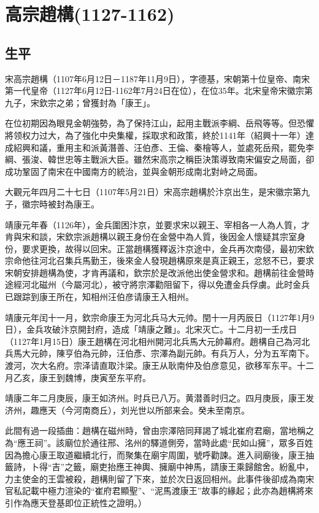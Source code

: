 
\section{高宗趙構\tiny(1127-1162)}

\subsection{生平}

宋高宗趙構（1107年6月12日－1187年11月9日），字德基，宋朝第十位皇帝、南宋第一代皇帝（1127年6月12日-1162年7月24日在位），在位35年。北宋皇帝宋徽宗第九子，宋欽宗之弟；曾獲封為「康王」。

在位初期因為眼見金朝強勢，為了保持江山，起用主戰派李綱、岳飛等等。但恐懼將领权力过大，為了強化中央集權，採取求和政策，終於1141年（紹興十一年）達成紹興和議，重用主和派黃潛善、汪伯彥、王倫、秦檜等人，並處死岳飛，罷免李綱、張浚、韓世忠等主戰派大臣。雖然宋高宗之稱臣決策導致南宋偏安之局面，卻成功鞏固了南宋在中國南方的統治，並與金朝形成南北對峙之局面。

大觀元年四月二十七日（1107年5月21日）宋高宗趙構於汴京出生，是宋徽宗第九子，徽宗時被封為康王。

靖康元年春（1126年），金兵圍困汴京，並要求宋以親王、宰相各一人為人質，才肯與宋和談，宋欽宗派趙構以親王身份在金營中為人質，後因金人懷疑其宗室身份，要求更換，故得以回宋。正當趙構獲釋返汴京途中，金兵再次南侵，最初宋欽宗命他往河北召集兵馬勤王，後來金人發現趙構原來是真正親王，忿怒不已，要求宋朝安排趙構為使，才肯再議和，欽宗於是改派他出使金營求和。趙構前往金營時途經河北磁州（今屬河北），被守將宗澤勸阻留下，得以免遭金兵俘虜。此时金兵已跟踪到康王所在，知相州汪伯彦请康王入相州。

靖康元年闰十一月，欽宗命康王为河北兵马大元帅。閏十一月丙辰日（1127年1月9日），金兵攻破汴京開封府，造成「靖康之難」。北宋灭亡。十二月初一壬戌日（1127年1月15日）康王趙構在河北相州開河北兵馬大元帥幕府。趙構自己為河北兵馬大元帥，陳亨伯為元帥，汪伯彥、宗澤為副元帥。有兵万人，分为五军南下。渡河，次大名府。宗泽请直取汴梁。康王从耿南仲及伯彦意见，欲移军东平。十二月乙亥，康王到魏博，庚寅至东平府。

靖康二年二月庚辰，康王如济州。时兵已八万。黄潜善时归之。四月庚辰，康王发济州，趣應天（今河南商丘），刘光世以所部来会。癸未至南京。

此間有過一段插曲：趙構在磁州時，曾由宗澤陪同拜謁了城北崔府君廟，當地稱之為“應王祠”。該廟位於通往邢、洺州的驛道側旁，當時此處“民如山擁”，眾多百姓因為擔心康王取道繼續北行，而聚集在廟宇周圍，號呼勸諫。進入祠廟後，康王抽籤詩，卜得“吉”之籤，廟吏抬應王神輿、擁廟中神馬，請康王乘歸館舍。紛亂中，力主使金的王雲被殺，趙構則留了下來，並於次日返回相州。此事件後卻成為南宋官私記載中極力渲染的“崔府君顯聖”、“泥馬渡康王”故事的緣起；此亦為趙構將來引作為應天登基即位正統性之證明。）


